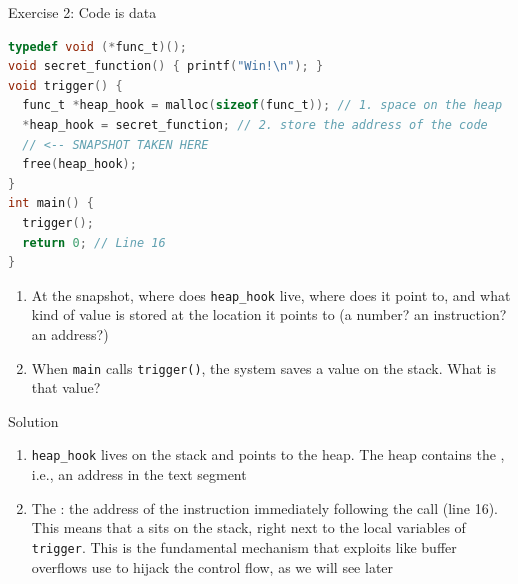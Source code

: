 \begin{parag}{Exercise 2: Code is data}
    \begin{lstlisting}[language=C]
typedef void (*func_t)();
void secret_function() { printf("Win!\n"); }
void trigger() {
  func_t *heap_hook = malloc(sizeof(func_t)); // 1. space on the heap
  *heap_hook = secret_function; // 2. store the address of the code
  // <-- SNAPSHOT TAKEN HERE
  free(heap_hook);
}
int main() {
  trigger();
  return 0; // Line 16
}
    \end{lstlisting}
    \begin{enumerate}
        \item At the snapshot, where does \texttt{heap\_hook} live, where does it point to, and what kind of value is stored at the location it points to (a number? an instruction? an address?)
        \item When \texttt{main} calls \texttt{trigger()}, the system saves a value on the stack. What is that value?
    \end{enumerate}
    \begin{subparag}{Solution}
        \begin{enumerate}
            \item \texttt{heap\_hook} lives on the stack and points to the heap. The heap contains the , i.e., an address in the text segment
            \item The : the address of the instruction immediately following the call (line 16). This means that a  sits on the stack, right next to the local variables of \texttt{trigger}. This is the fundamental mechanism that exploits like buffer overflows use to hijack the control flow, as we will see later
        \end{enumerate}
    \end{subparag}
\end{parag}

